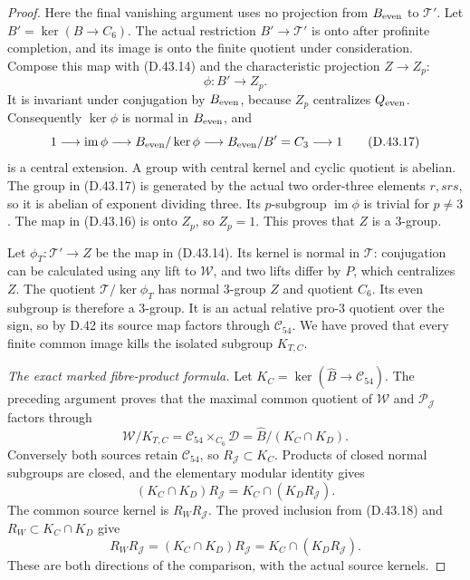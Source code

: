 \begin{proof}
Here the final
vanishing argument
uses no projection
from $B_{\rm even}$
to $\mathcal T'$.
Let $B'=\ker(B\to C_6)$.
The actual restriction
$B'\to\mathcal T'$
is onto after
profinite completion,
and its image is
onto the finite
quotient under
consideration.
Compose this map
with (D.43.14)
and the characteristic
projection $Z\to Z_p$:
\[
              \phi:B'\longrightarrow Z_p.                     \tag{D.43.16}
\]
It is invariant
under conjugation
by $B_{\rm even}$,
because $Z_p$
centralizes
$Q_{\rm even}$.
Consequently
$\ker\phi$ is
normal in
$B_{\rm even}$,
and
\[
 1\longrightarrow\operatorname{im}\phi
  \longrightarrow B_{\rm even}/\ker\phi
  \longrightarrow B_{\rm even}/B'=C_3
  \longrightarrow1                                           \tag{D.43.17}
\]
is a central extension.
A group with central
kernel and cyclic
quotient is abelian.
The group in
(D.43.17) is generated
by the actual two
order-three elements
$r,srs$, so it is
abelian of exponent
dividing three.
Its $p$-subgroup
$\operatorname{im}\phi$
is trivial for
$p\ne3$.
The map in
(D.43.16) is onto
$Z_p$, so $Z_p=1$.
This proves that
$Z$ is a $3$-group.

Let $\phi_T:\mathcal T'\to Z$
be the map in
(D.43.14). Its
kernel is normal
in $\mathcal T$:
conjugation can
be calculated using
any lift to
$\mathcal W$, and
two lifts differ
by $P$, which
centralizes $Z$.
The quotient
$\mathcal T/\ker\phi_T$
has normal $3$-group
$Z$ and quotient
$C_6$. Its even
subgroup is therefore
a $3$-group.
It is an actual
relative pro-$3$
quotient over
the sign, so by
D.42 its source
map factors through
$\mathcal C_{54}$.
We have proved
that every finite
common image kills
the isolated subgroup
$K_{T,C}$.

\emph{The exact marked fibre-product formula.}
Let $K_C=\ker(\widehat B\to\mathcal C_{54})$.
The preceding argument
proves that the maximal
common quotient of
$\mathcal W$ and
$\mathcal P_{\mathscr J}$
factors through
\[
 \mathcal W/K_{T,C}
      =\mathcal C_{54}\times_{C_6}\mathcal D
      =\widehat B/(K_C\cap K_D).                       \tag{D.43.18}
\]
Conversely both sources
retain $\mathcal C_{54}$,
so $R_{\mathscr J}\subset K_C$.
Products of closed
normal subgroups are
closed, and the elementary
modular identity gives
\[
 (K_C\cap K_D)R_{\mathscr J}
     =K_C\cap(K_D R_{\mathscr J}).
                                                               \tag{D.43.19}
\]
The common source
kernel is
$R_W R_{\mathscr J}$.
The proved inclusion
from (D.43.18) and
$R_W\subset K_C\cap K_D$
give
\[
 R_W R_{\mathscr J}
   =(K_C\cap K_D)R_{\mathscr J}
   =K_C\cap(K_D R_{\mathscr J}).                        \tag{D.43.20}
\]
These are both
directions of the
comparison, with
the actual source
kernels.


\end{proof}

